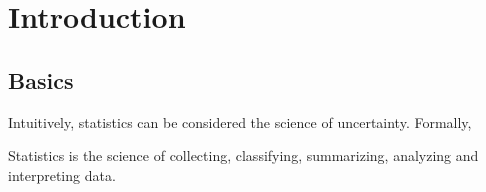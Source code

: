 \chapter{Introduction}
\label{sec.matrix}
\pagestyle{myheadings}  

\section{Basics}


Intuitively, statistics can be considered the science of uncertainty. Formally,


\begin{definition}[Statistics]	
Statistics is the science of collecting, classifying, summarizing, analyzing and interpreting data.
\end{definition}

